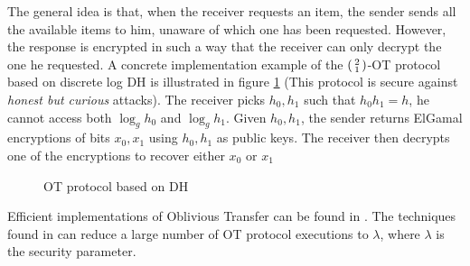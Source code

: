 The general idea is that, when the receiver requests an item, the sender sends
all the available items to him, unaware of which one has been requested. However, the response is encrypted in such a way that the receiver
can only decrypt the one he requested. A concrete implementation example of the
\(\begin{psmallmatrix} 2 \\ 1 \end{psmallmatrix} \)-OT protocol based on
discrete log DH is illustrated in figure \ref{fig:DH21OT} (This protocol is
secure against \textit{honest but curious} attacks). The receiver picks
\(h_{0},h_{1}\) such that \(h_{0}h_{1} = h\), he cannot access both
\(\log_{g}h_{0}\) and \(\log_{g}h_{1}\). Given \(h_{0}, h_{1}\), the sender
returns ElGamal encryptions of bits \(x_{0}, x_{1}\) using \(h_{0},h_{1}\) as
public keys. The receiver then decrypts one of the encryptions to recover either
\(x_{0} \text{ or } x_{1}\)

\begin{figure}[htbp!] 
  \centering
  \caption{OT protocol based on DH}
  \label{fig:DH21OT}
\end{figure}

Efficient implementations of Oblivious Transfer can be found in
\cite{naor2001efficient35}. The techniques found in \cite{ishai2003extending24}
can reduce a large number of OT protocol executions to \(\lambda\), where
\(\lambda\) is the security parameter.

